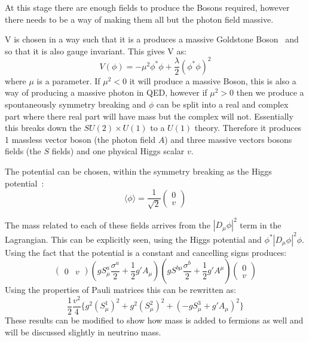 At this stage there are enough fields to produce the Bosons required, however there needs to be a way of making them all but the photon field massive.

V is chosen in a way such that it is a produces a massive Goldstone Boson~\cite{80Goldstone} and so that it is also gauge invariant. This gives V as:
\begin{equation}
V(\phi) = - \mu^2 \phi^{*}\phi + \frac{\lambda}{2}(\phi^{*}\phi)^2
\end{equation}
where $\mu$ is a parameter.
If $\mu^2 <0$ it will produce a massive Boson, this is also a way of producing a massive photon in QED, however if $\mu^2 >0$ then we produce a  spontaneously symmetry breaking and $\phi$ can be split into a real and complex part where there real part will have mass but the complex will not. Essentially this breaks down the $SU(2) \times U(1)$ to a $U(1)$ theory. Therefore it produces 1 massless vector boson (the photon field $A$) and three massive vectors bosons fields (the $S$ fields) and one physical Higgs scalar $v$. 

The potential can be chosen, within the symmetry breaking as the Higgs potential~\cite{35Higgs}:
\begin{equation}
\langle \phi \rangle = \frac{1}{\sqrt{2}}
\begin{pmatrix}
    0\\
    v
\end{pmatrix}
\end{equation}

The mass related to each of these fields arrives from the $|D_\mu \phi |^2$ term in the Lagrangian. This can be explicitly seen, using the Higgs potential and $\phi^* |D_\mu \phi |^2 \phi$. Using the fact that the potential is a constant and cancelling signs produces:
\begin{equation}
\begin{pmatrix}
    0 & v
\end{pmatrix}
(
g S^a_\mu \frac{\sigma^a}{2} + \frac{1}{2}g' A_\mu
)
(
g S^{b\mu} \frac{\sigma^b}{2} + \frac{1}{2}g' A^\mu
)
\begin{pmatrix}
    0\\
    v
\end{pmatrix}
\end{equation}
Using the properties of Pauli matrices this can be rewritten as:
\begin{equation}
\frac{1}{2}\frac{v^2}{4}\lbrace g^2 (S_\mu^1)^2 + g^2 (S_\mu^2)^2 + (-gS^3_\mu+g' A_\mu)^2 \rbrace
\end{equation}
These results can be modified to show how mass is added to fermions as well and will be discussed slightly in neutrino mass.

